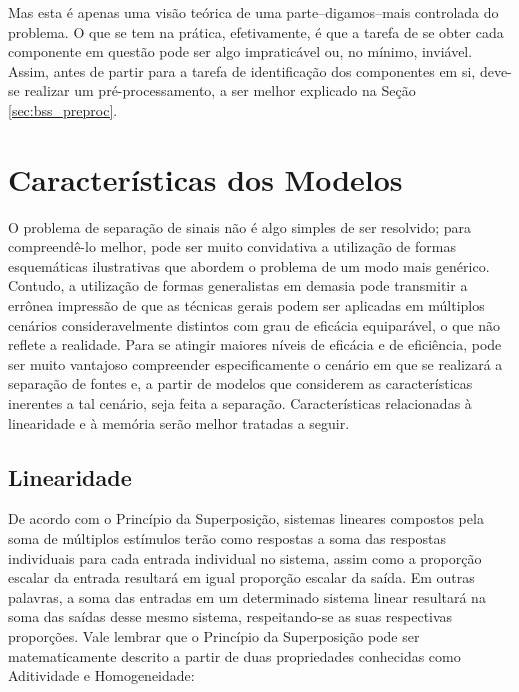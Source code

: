 Mas esta é apenas uma visão teórica de uma parte--digamos--mais controlada do problema. O que se tem na prática, efetivamente, é que a tarefa de se obter cada componente em questão pode ser algo impraticável ou, no mínimo, inviável. Assim, antes de partir para a tarefa de identificação dos componentes em si, deve-se realizar um pré-processamento, a ser melhor explicado na Seção \ref{sec:bss_preproc}.



\section{Características dos Modelos}
\label{sec:bss_characteristics}

O problema de separação de sinais não é algo simples de ser resolvido; para compreendê-lo melhor, pode ser muito convidativa a utilização de formas esquemáticas ilustrativas que abordem o problema de um modo mais genérico. Contudo, a utilização de formas generalistas em demasia pode transmitir a errônea impressão de que as técnicas gerais podem ser aplicadas em múltiplos cenários consideravelmente distintos com grau de eficácia equiparável, o que não reflete a realidade. Para se atingir maiores níveis de eficácia e de eficiência, pode ser muito vantajoso compreender especificamente o cenário em que se realizará a separação de fontes e, a partir de modelos que considerem as características inerentes a tal cenário, seja feita a separação. Características relacionadas à linearidade e à memória serão melhor tratadas a seguir.


\subsection{Linearidade}
\label{subsec:bss_linearity}

De acordo com o Princípio da Superposição, sistemas lineares compostos pela soma de múltiplos estímulos terão como respostas a soma das respostas individuais para cada entrada individual no sistema, assim como a proporção escalar da entrada resultará em igual proporção escalar da saída. Em outras palavras, a soma das entradas em um determinado sistema linear resultará na soma das saídas desse mesmo sistema, respeitando-se as suas respectivas proporções. Vale lembrar que o Princípio da Superposição pode ser matematicamente descrito a partir de duas propriedades conhecidas como Aditividade e Homogeneidade:\\

